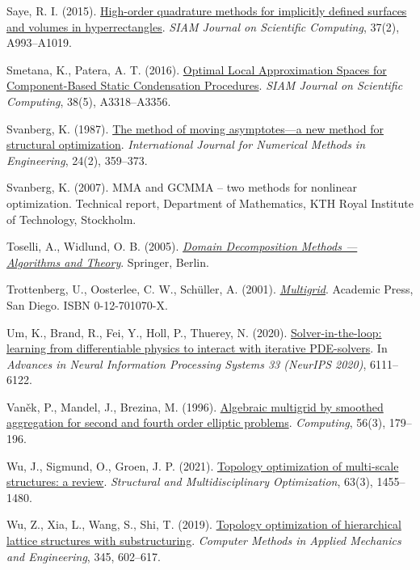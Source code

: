 \documentclass[preprint,12pt,authoryear]{elsarticle}
\begin{document}
Saye, R. I. (2015). \href{https://doi.org/10.1137/140966290}{High-order quadrature methods for implicitly defined surfaces and volumes in hyperrectangles}. \emph{SIAM Journal on Scientific Computing}, 37(2), A993--A1019.

Smetana, K., Patera, A. T. (2016). \href{https://doi.org/10.1137/15m1009603}{Optimal Local Approximation Spaces for Component-Based Static Condensation Procedures}. \emph{SIAM Journal on Scientific Computing}, 38(5), A3318--A3356.

Svanberg, K. (1987). \href{https://doi.org/10.1002/nme.1620240207}{The method of moving asymptotes---a new method for structural optimization}. \emph{International Journal for Numerical Methods in Engineering}, 24(2), 359--373.

Svanberg, K. (2007). MMA and GCMMA -- two methods for nonlinear optimization. Technical report, Department of Mathematics, KTH Royal Institute of Technology, Stockholm.

Toselli, A., Widlund, O. B. (2005). \href{https://doi.org/10.1007/b137868}{\emph{Domain Decomposition Methods --- Algorithms and Theory}}. Springer, Berlin.

Trottenberg, U., Oosterlee, C. W., Schüller, A. (2001). \href{https://shop.elsevier.com/books/multigrid/trottenberg/978-0-12-701070-0}{\emph{Multigrid}}. Academic Press, San Diego. ISBN 0-12-701070-X.

Um, K., Brand, R., Fei, Y., Holl, P., Thuerey, N. (2020). \href{https://proceedings.neurips.cc/paper/2020/hash/43e4e6a6f341e00671e123714de019a8-Abstract.html}{Solver-in-the-loop: learning from differentiable physics to interact with iterative PDE-solvers}. In \emph{Advances in Neural Information Processing Systems 33 (NeurIPS 2020)}, 6111--6122.

Vaněk, P., Mandel, J., Brezina, M. (1996). \href{https://doi.org/10.1007/BF02238511}{Algebraic multigrid by smoothed aggregation for second and fourth order elliptic problems}. \emph{Computing}, 56(3), 179--196.

Wu, J., Sigmund, O., Groen, J. P. (2021). \href{https://doi.org/10.1007/s00158-021-02881-8}{Topology optimization of multi-scale structures: a review}. \emph{Structural and Multidisciplinary Optimization}, 63(3), 1455--1480.

Wu, Z., Xia, L., Wang, S., Shi, T. (2019). \href{https://doi.org/10.1016/j.cma.2018.11.003}{Topology optimization of hierarchical lattice structures with substructuring}. \emph{Computer Methods in Applied Mechanics and Engineering}, 345, 602--617.
\end{document}
